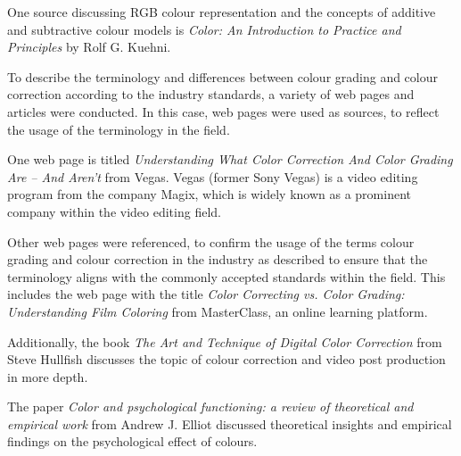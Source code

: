 \documentclass[../MasterThesis.tex]{subfiles}
\begin{document}
	
	\begin{description}[font=\color{RedViolet!80!black}, style=nextline]
		
		\item[RGB representation] 
		
		One source discussing RGB colour representation and the concepts of additive and subtractive colour models is \textit{Color: An Introduction to Practice and Principles} by Rolf G. Kuehni.~\cite{colourRGB}
		
		
		
		
		\item[Colour grading] 
		
		To describe the terminology and differences between colour grading and colour correction according to the industry standards, a variety of web pages and articles were conducted. In this case, web pages were used as sources, to reflect the usage of the terminology in the field. 
		
		One web page is titled \textit{Understanding What Color Correction And Color Grading Are – And Aren’t} from Vegas. Vegas (former Sony Vegas) is a video editing program from the company Magix, which is widely known as a prominent company within the video editing field.~\cite{cc_cg_1}
		
		Other web pages were referenced, to confirm the usage of the terms colour grading and colour correction in the industry as described to ensure that the terminology aligns with the commonly accepted standards within the field. This includes the web page with the title \textit{Color Correcting vs. Color Grading: Understanding Film Coloring} from MasterClass, an online learning platform.~\cite{cc_cg_2} 
		
		
		Additionally, the book \textit{The Art and Technique of Digital Color Correction} from Steve Hullfish discusses the topic of colour correction and video post production in more depth.~\cite{cc1}
		
		
		
		\item[Effects of different colour]
		
		
		The paper \textit{Color and psychological functioning: a review of theoretical and empirical work} from Andrew J. Elliot discussed theoretical insights and empirical findings on the psychological effect of colours.~\cite{colour}
		

\end{description}
\end{document}
